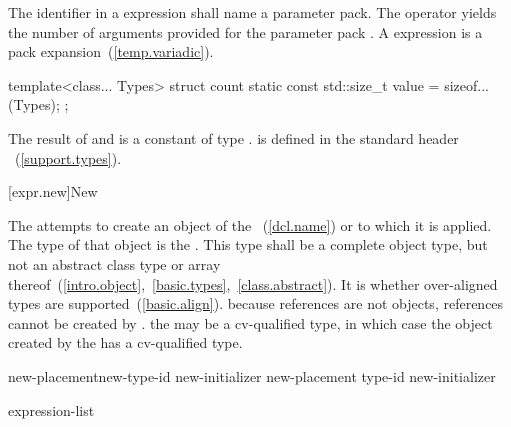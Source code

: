 \pnum
The identifier in a  expression shall name a parameter
pack. The  operator yields the number of arguments
provided for the parameter pack .
A  expression is a pack expansion~(\ref{temp.variadic}).
\enterexample

\begin{codeblock}
template<class... Types>
struct count {
  static const std::size_t value = sizeof...(Types);
};
\end{codeblock}
\exitexample

\pnum
The result of  and  is a constant of type
.
\enternote 
{}%
%
 is defined in the standard header
%
~(\ref{support.types}).
\exitnote 

[expr.new]{New}

\pnum
{}%
%
%
%
%
The  attempts to create an object of the
~(\ref{dcl.name}) or  to which
it is applied. The type of that object is the .
%
This type shall be a complete object type, but not an abstract class
type or array
thereof~(\ref{intro.object},~\ref{basic.types},~\ref{class.abstract}).
It is  whether over-aligned types are
supported~(\ref{basic.align}).
\enternote 
because references are not objects, references cannot be created by
.
\exitnote 
\enternote 
the  may be a cv-qualified type, in which case the
object created by the  has a cv-qualified type.
\exitnote 

\begin{bnf}
\br
    \terminal{::}\opt {} new-placement\opt new-type-id new-initializer\opt \br
    \terminal{::}\opt {} new-placement\opt \terminal{(} type-id \terminal{)} new-initializer\opt
\end{bnf}

%
%
\begin{bnf}
\br
    \terminal{(} expression-list \terminal{)}
\end{bnf}

